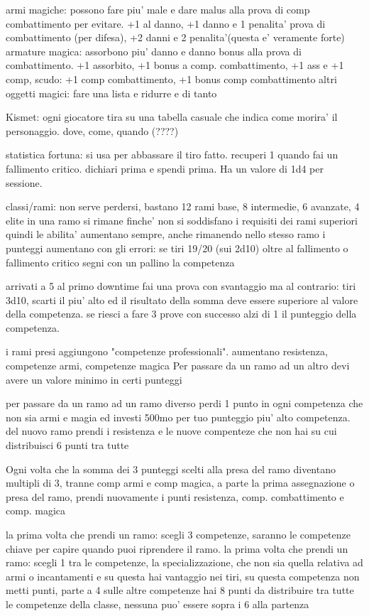 \documentclass[12pt,a4paper,twoside,openany]{book}
\begin{document}
armi magiche: possono fare piu' male e dare malus alla prova di comp combattimento per evitare. +1 al danno, +1 danno e 1 penalita' prova di combattimento (per difesa), +2 danni e 2 penalita'(questa e' veramente forte)
armature magica: assorbono piu' danno e danno bonus alla prova di combattimento. +1 assorbito, +1 bonus a comp. combattimento, +1 ass e +1 comp, 
scudo: +1 comp combattimento, +1 bonus comp combattimento
altri oggetti magici: fare una lista e ridurre e di tanto

Kismet: ogni giocatore tira su una tabella casuale che indica come morira' il personaggio. dove, come, quando (????)

statistica fortuna: si usa per abbassare il tiro fatto. recuperi 1 quando fai un fallimento critico. dichiari prima e spendi prima.
Ha un valore di 1d4 per sessione.

classi/rami: non serve perdersi, bastano 12 rami base, 8 intermedie, 6 avanzate, 4 elite
in una ramo si rimane finche' non si soddisfano i requisiti dei rami superiori
quindi le abilita' aumentano sempre, anche rimanendo nello stesso ramo
i punteggi aumentano con gli errori: se tiri 19/20 (sui 2d10) oltre al fallimento o fallimento critico segni con un pallino la competenza

arrivati a 5 al primo downtime fai una prova con svantaggio ma al contrario: tiri 3d10, scarti il piu' alto ed il risultato della somma deve essere superiore al valore della competenza. se riesci a fare 3 prove con successo alzi di 1 il punteggio della competenza.

i rami presi aggiungono "competenze professionali". aumentano resistenza, competenze armi, competenze magica Per passare da un ramo ad un altro devi avere un valore minimo in certi punteggi

per passare da un ramo ad un ramo diverso perdi 1 punto in ogni competenza che non sia armi e magia ed investi 500mo per tuo punteggio piu' alto competenza. del nuovo ramo prendi i resistenza e le nuove compenteze che non hai su cui distribuisci 6 punti tra tutte

Ogni volta che la somma dei 3 punteggi scelti alla presa del ramo diventano multipli di 3, tranne comp armi e comp magica, a parte la prima assegnazione o presa del ramo, prendi nuovamente i punti resistenza, comp. combattimento e comp. magica

la prima volta che prendi un ramo: scegli 3 competenze, saranno le competenze chiave per capire quando puoi riprendere il ramo.
la prima volta che prendi un ramo: scegli 1 tra le competenze, la specializzazione, che non sia quella relativa ad armi o incantamenti e su questa hai vantaggio nei tiri, su questa competenza non metti punti, parte a 4
sulle altre competenze hai 8 punti da distribuire tra tutte le competenze della classe, nessuna puo' essere sopra i 6 alla partenza
\end{document}
